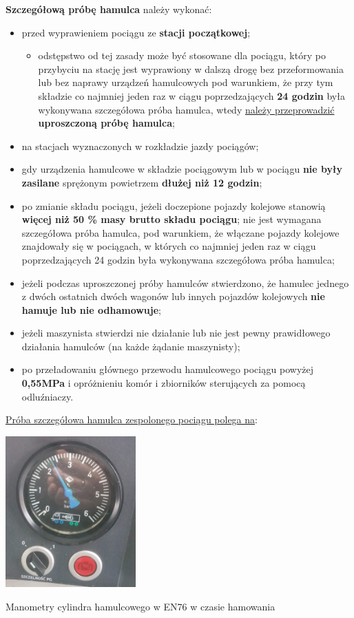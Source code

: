 \textbf{Szczegółową próbę hamulca} należy wykonać: 
\begin{itemize}
	\item przed wyprawieniem pociągu ze \textbf{stacji początkowej}; 
	
	\begin{itemize}
		\item odstępstwo od tej zasady może być stosowane dla pociągu, który po przybyciu na stację jest wyprawiony w dalszą
		drogę bez przeformowania lub bez naprawy urządzeń hamulcowych pod warunkiem, że przy tym składzie co najmniej jeden raz
		w ciągu poprzedzających \textbf{24 godzin} była wykonywana szczegółowa próba hamulca, wtedy \underline{należy przeprowadzić} \textbf{uproszczoną próbę hamulca}; 
	\end{itemize}
	\item na stacjach wyznaczonych w rozkładzie jazdy pociągów;
	\item gdy urządzenia hamulcowe w składzie pociągowym lub w pociągu \textbf{nie były} \textbf{zasilane} sprężonym powietrzem \textbf{dłużej niż 12 godzin}; 
	\item po zmianie składu pociągu, jeżeli doczepione pojazdy kolejowe stanowią \textbf{więcej niż 50 \% masy brutto składu pociągu}; nie jest wymagana szczegółowa próba hamulca, pod warunkiem, że włączane pojazdy kolejowe znajdowały się w pociągach, w których co najmniej jeden raz w ciągu poprzedzających 24 godzin była wykonywana szczegółowa próba hamulca;
	
	\item jeżeli podczas uproszczonej próby hamulców stwierdzono, że hamulec jednego z dwóch ostatnich dwóch wagonów lub innych pojazdów kolejowych \textbf{nie hamuje lub nie odhamowuje}; 
	\item jeżeli maszynista stwierdzi nie działanie lub nie jest pewny prawidłowego działania hamulców (na każde żądanie maszynisty); 
	\item po przeładowaniu głównego przewodu hamulcowego pociągu powyżej \textbf{0,55MPa} i opróżnieniu komór i zbiorników sterujących za pomocą odluźniaczy.
\end{itemize}

\underline{Próba szczegółowa hamulca zespolonego pociągu polega na}: 
\begin{marginfigure}
	\includegraphics[width=5cm]{skryptkierownik-img/manometry-zahamowane-ep.jpg}
	\caption{Manometry cylindra hamulcowego w EN76 w czasie hamowania}
\end{marginfigure}

